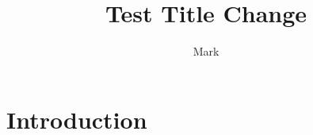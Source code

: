 \documentclass{article}
\title{Test Title Change}
\author{Mark}
\begin{document}
\maketitle

\section{Introduction}
\end{document}
